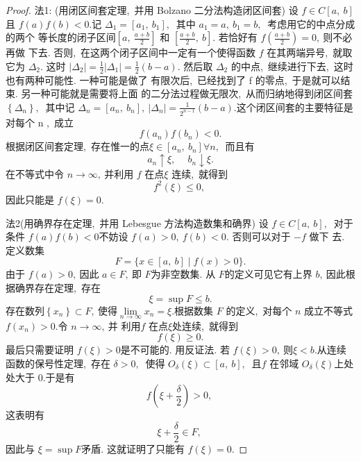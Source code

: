 \begin{proof}
	法1:
	(用闭区间套定理,\  并用 Bolzano 二分法构造闭区间套) 设 $ f \in C[a,\  b] $ 且  $f(a) f(b)<0 . $记 $ \Delta_{1}=\left[a_{1},\  b_{1}\right] ,\ $ 其中  $a_{1}=a,\  b_{1}=b ,\ $ 考虑用它的中点分成的两个 等长度的闭子区间$  \left[a,\  \frac{a+b}{2}\right] $ 和  $\left[\frac{a+b}{2},\  b\right] .$ 若恰好有  $f\left(\frac{a+b}{2}\right)=0 ,\  $则不必再做 下去. 否则,\  在这两个闭子区间中一定有一个使得函数 $f$  在其两端异号,\  就取它为  $\Delta_{2} .$ 这时  $\left|\Delta_{2}\right|=\frac{1}{2}\left|\Delta_{1}\right|=\frac{1}{2}(b-a) .$
	然后取 $ \Delta_{2} $ 的中点,\  继续进行下去,\  这时也有两种可能性. 一种可能是做了 有限次后,\  已经找到了  f  的零点,\  于是就可以结束. 另一种可能就是需要将上面 的二分法过程做无限次,\  从而归纳地得到闭区间套 $ \left\{\Delta_{n}\right\} ,\ $ 其中记 $ \Delta_{n}=\left[a_{n},\  b_{n}\right] ,\   \left|\Delta_{n}\right|=\frac{1}{2^{n-1}}(b-a) . $这个闭区间套的主要特征是对每个  n ,\  成立
	$$f\left(a_{n}\right) f\left(b_{n}\right)<0 .$$
	根据闭区间套定理,\  存在惟一的点$  \xi \in\left[a_{n},\  b_{n}\right] \forall n ,\ $ 而且有
	$$a_{n} \uparrow \xi,\  \quad b_{n} \downarrow \xi .$$
	在不等式中令 $ n \rightarrow \infty ,\  $并利用 $ f $ 在点$  \xi $ 连续,\  就得到
	$$f^{2}(\xi) \leqslant 0,\ $$
	因此只能是 $ f(\xi)=0 .$
	
	法2(用确界存在定理,\  并用 Lebesgue 方法构造数集和确界) 设 $ f \in   C[a,\  b] ,\ $ 对于条件  $f(a) f(b)<0  $不妨设 $ f(a)>0,\  f(b)<0 .$ 否则可以对于  $-f $ 做下 去.
	定义数集
	$$F=\{x \in[a,\  b] \mid f(x)>0\} .$$
	由于 $ f(a)>0 ,\  $因此 $ a \in F ,\ $即 $ F  $为非空数集.
	从  $F  $的定义可见它有上界 $ b ,\  $因此根据确界存在定理,\  存在
	$$\xi=\sup F \leqslant b .$$
	存在数列$ \left\{x_{n}\right\} \subset F ,\  $使得$  \lim\limits_{n \rightarrow \infty} x_{n}=\xi . $根据数集  $F$  的定义,\  对每个 $ n $ 成立不等式  $f\left(x_{n}\right)>0 . $令 $ n \rightarrow \infty ,\ $并 利用$  f $ 在点$  \xi  $处连续,\  就得到
	$$f(\xi) \geqslant 0 .$$
	最后只需要证明 $ f(\xi)>0  $是不可能的.
	用反证法. 若 $ f(\xi)>0 ,\  $则$  \xi<b . $从连续函数的保号性定理,\  存在  $\delta>0 ,\ $ 使得 $ O_{\delta}(\xi) \subset[a,\  b] ,\ $ 且$  f$  在邻域  $O_{\delta}(\xi)  $上处处大于 $0 . $于是有
	$$f\left(\xi+\frac{\delta}{2}\right)>0,\ $$
	这表明有
	$$\xi+\frac{\delta}{2} \in F,\ $$
	因此与 $ \xi=\sup F  $矛盾. 这就证明了只能有  $f(\xi)=0 .$
	

\end{proof}
